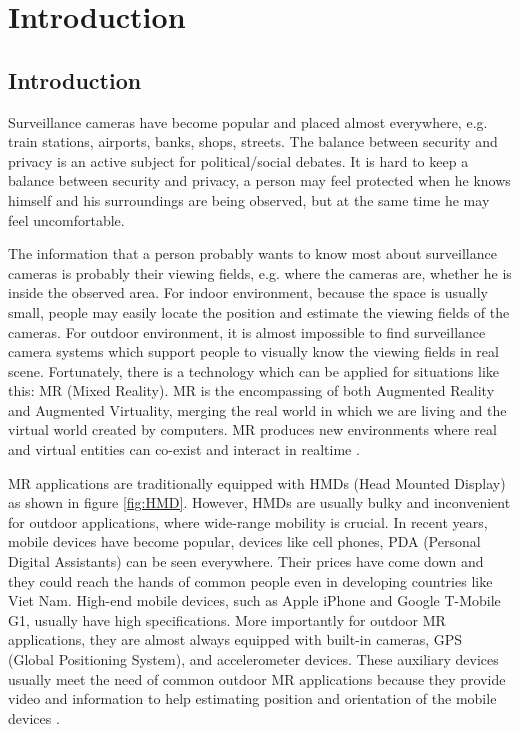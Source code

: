 \chapter{Introduction}
\label{Chapter1}


\section{Introduction}

Surveillance cameras have become popular and placed almost everywhere, e.g. train stations, airports, banks, shops, streets. The balance between security and privacy is an active subject for political/social debates. It is hard to keep a balance between security and privacy, a person may feel protected when he knows himself and his surroundings are being observed, but at the same time he may feel uncomfortable.

The information that a person probably wants to know most about surveillance cameras is probably their viewing fields, e.g. where the cameras are, whether he is inside the observed area. For indoor environment, because the space is usually small, people may easily locate the position and estimate the viewing fields of the cameras. For outdoor environment, it is almost impossible to find surveillance camera systems which support people to visually know the viewing fields in real scene. Fortunately, there is a technology which can be applied for situations like this: MR (Mixed Reality). MR is the encompassing of both Augmented Reality and Augmented Virtuality, merging the real world in which we are living and the virtual world created by computers. MR produces new environments where real and virtual entities can co-exist and interact in realtime \cite{Reference3}.

MR applications are traditionally equipped with HMDs (Head Mounted Display) as shown in figure \ref{fig:HMD}. However, HMDs are usually bulky and inconvenient for outdoor applications, where wide-range mobility is crucial. In recent years, mobile devices have become popular, devices like cell phones, PDA (Personal Digital Assistants) can be seen everywhere. Their prices have come down and they could reach the hands of common people even in developing countries like Viet Nam. High-end mobile devices, such as Apple iPhone and Google T-Mobile G1, usually have high specifications. More importantly for outdoor MR applications, they are almost always equipped with built-in cameras, GPS (Global Positioning System), and accelerometer devices. These auxiliary devices usually meet the need of common outdoor MR applications because they provide video and information to help estimating position and orientation of the mobile devices \cite{Reference2} \cite{Reference4}.

